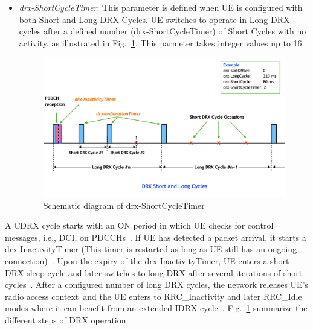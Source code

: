 \documentclass[]{IEEEtran}
\begin{document}
\begin{itemize}
    \item \textit{drx-ShortCycleTimer}: This parameter is defined when UE is configured with both Short and Long DRX Cycles. UE switches to operate in Long DRX cycles after a defined number (drx-ShortCycleTimer) of Short Cycles with no activity, as illustrated in Fig.~\ref{fig:5g-drx-ShortCycleTimer}. This parmeter takes integer values up to 16.
\begin{figure}
    \centering
    \includegraphics[width=\linewidth]{Pictures/Schematic diagram of drx-ShortCycleTimer.png}
    \caption{Schematic diagram of drx-ShortCycleTimer}
    \label{fig:5g-drx-ShortCycleTimer}
\end{figure}

\end{itemize}

A CDRX cycle starts with an ON period in which UE checks for control messages, i.e., DCI, on PDCCHs~\cite{tung2015analysis}. 
If UE has detected a packet arrival, it starts a drx-InactivityTimer (This timer is restarted as long as UE still has an ongoing connection)~\cite{bontu2009drx}. 
Upon the expiry of the drx-InactivityTimer, UE enters a short DRX sleep cycle and later switches to long DRX after several iterations of short cycles~\cite{tseng2015delay}. 
After a configured number of long DRX cycles, the network releases UE's radio access context~\cite{agiwal2022enhanced}and the UE enters to RRC\_Inactivity and later RRC\_Idle modes where it can benefit from an extended IDRX cycle~\cite{kumar2021analytical}. Fig.~\ref{fig:5g-drx-ShortCycleTimer} summarize the different steps of DRX operation.
\end{document}
